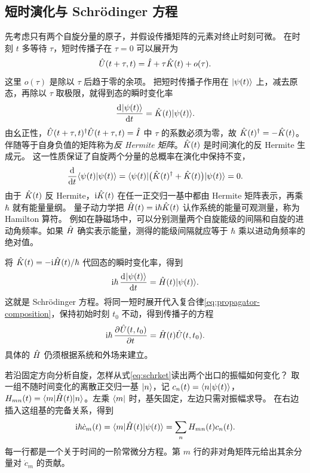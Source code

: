 \subsection{短时演化与 Schrödinger 方程}
先考虑只有两个自旋分量的原子，并假设传播矩阵的元素对终止时刻可微。
在时刻 $t$ 多等待 $\tau$，短时传播子在 $\tau = 0$ 可以展开为
\[
    \hat{U}(t + \tau,t) = \hat{I} + \tau\hat{K}(t) + o(\tau).
\]
这里 $o(\tau)$ 是除以 $\tau$ 后趋于零的余项。
把短时传播子作用在 $\lvert\psi(t)\rangle$ 上，减去原态，再除以 $\tau$ 取极限，就得到态的瞬时变化率
\[
    \frac{\mathop{}\!\mathrm{d}^{}\lvert\psi(t)\rangle}{\mathrm{d}{t}^{}} = \hat{K}(t)\lvert\psi(t)\rangle .
\]
由幺正性，$\hat{U}(t + \tau,t)^\dagger\hat{U}(t + \tau,t) = \hat{I}$ 中 $\tau$ 的系数必须为零，故 $\hat{K}(t)^\dagger = -\hat{K}(t)$。
伴随等于自身负值的矩阵称为\emph{反 Hermite 矩阵}。$\hat{K}(t)$ 是时间演化的反 Hermite 生成元。
这一性质保证了自旋两个分量的总概率在演化中保持不变，
\[
    \frac{\mathop{}\!\mathrm{d}^{}}{\mathrm{d}{t}^{}}\langle\psi(t)\vert\psi(t)\rangle
    = \langle\psi(t)\vert\bigl(\hat{K}(t)^\dagger + \hat{K}(t)\bigr)\vert\psi(t)\rangle = 0 .
\]
由于 $\hat{K}(t)$ 反 Hermite，$\mathrm{i}\hat{K}(t)$ 在任一正交归一基中都由 Hermite 矩阵表示，再乘 $\hbar$ 就有能量量纲。
量子动力学把 $\hat{H}(t) = \mathrm{i}\hbar\hat{K}(t)$ 认作系统的能量可观测量，称为 Hamilton 算符。
例如在静磁场中，可以分别测量两个自旋能级的间隔和自旋的进动角频率。如果 $\hat{H}$ 确实表示能量，测得的能级间隔就应等于 $\hbar$ 乘以进动角频率的绝对值。

将 $\hat{K}(t) = -\mathrm{i}\hat{H}(t)/\hbar$ 代回态的瞬时变化率，得到
\begin{equation}
    \mathrm{i}\hbar\,\frac{\mathop{}\!\mathrm{d}^{}\lvert\psi(t)\rangle}{\mathrm{d}{t}^{}} = \hat{H}(t)\lvert\psi(t)\rangle .
    \label{eq:schrket}
\end{equation}
这就是 Schrödinger 方程。将同一短时展开代入复合律\eqref{eq:propagator-composition}，保持初始时刻 $t_0$ 不动，得到传播子的方程
\begin{equation}
    \mathrm{i}\hbar\,\frac{\partial^{}\hat{U}(t,t_0)}{\partial{t}^{}} = \hat{H}(t)\hat{U}(t,t_0).
\end{equation}
具体的 $\hat{H}$ 仍须根据系统和外场来建立。

若沿固定方向分析自旋，怎样从式\eqref{eq:schrket}读出两个出口的振幅如何变化？
取一组不随时间变化的离散正交归一基 $\lvert n\rangle$，记 $c_n(t) = \langle n\vert\psi(t)\rangle$，
$H_{mn}(t) = \langle m\vert\hat{H}(t)\vert n\rangle$。左乘 $\langle m\rvert$ 时，基矢固定，左边只需对振幅求导。
在右边插入这组基的完备关系，得到
\begin{equation}\label{eq:qm-fixed-basis-dynamics}
    \mathrm{i}\hbar\dot c_m(t) = \langle m\vert\hat{H}(t)\vert\psi(t)\rangle
    = \sum_n H_{mn}(t)c_n(t).
\end{equation}
每一行都是一个关于时间的一阶常微分方程。第 $m$ 行的非对角矩阵元给出其余分量对 $\dot c_m$ 的贡献。

